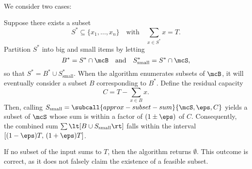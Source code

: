 \documentclass{article}
\begin{document}
\begin{solution}
  \begin{subproof}[Correctness]
  We consider two cases:

     Suppose there exists a subset
    \[
    S^* \subseteq \{x_1, \dots, x_n\} \quad \text{with} \quad \sum_{x \in S^*} x = T.
    \]
    Partition \( S^* \) into big and small items by letting
    \[
    B^* = S^* \cap \mcB \quad \text{and} \quad S^*_{\text{small}} = S^* \cap \mcS,
    \]
    so that \( S^* = B^* \cup S^*_{\text{small}} \).
    When the algorithm enumerates subsets of \( \mcB \), it will eventually consider a subset \( B \) corresponding to \( B^* \).
    Define the residual capacity
    \[
    C = T - \sum_{x \in B} x.
    \]
    Then, calling \( S_{\text{small}} = \subcall{approx-subset-sum}{\mcS, \eps, C} \) yields a subset of \( \mcS \) whose sum is within a factor of \( (1\pm\eps) \) of \( C \).
    Consequently, the combined sum \( \sum \lt[B \cup S_{\text{small}}\rt] \) falls within the interval \( [(1-\eps)T,\,(1+\eps)T] \).

     If no subset of the input sums to \( T \), then the algorithm returns \( \emptyset \).
    This outcome is correct, as it does not falsely claim the existence of a feasible subset.
  \end{subproof}
\end{solution}
\pagebreak
\end{document}

